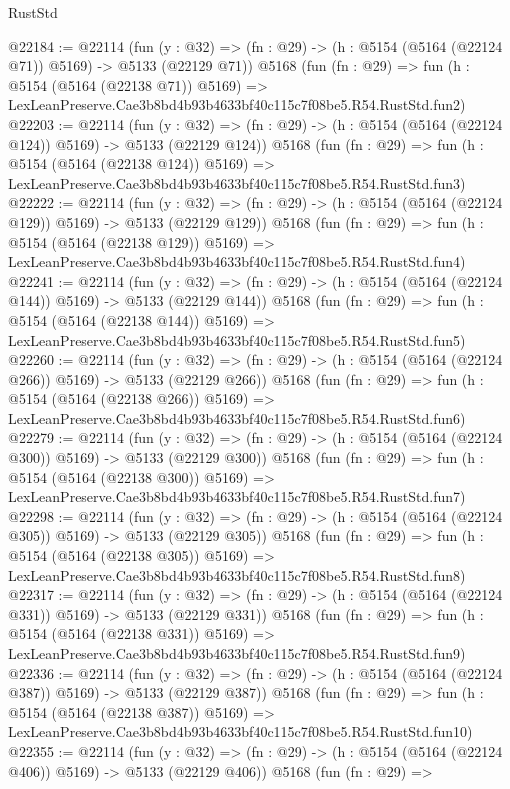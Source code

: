 \begin{lexlean}{RustStd}
\begin{coremodule}
@22184 := @22114
    (fun (y : @32) => (fn : @29) -> (h : @5154 (@5164 (@22124 @71)) @5169) -> @5133 (@22129 @71))
    @5168
    (fun (fn : @29) =>
    fun (h : @5154 (@5164 (@22138 @71)) @5169) =>
    LexLeanPreserve.Cae3b8bd4b93b4633bf40c115c7f08be5.R54.RustStd.fun2)
@22203 := @22114
    (fun (y : @32) => (fn : @29) -> (h : @5154 (@5164 (@22124 @124)) @5169) -> @5133 (@22129 @124))
    @5168
    (fun (fn : @29) =>
    fun (h : @5154 (@5164 (@22138 @124)) @5169) =>
    LexLeanPreserve.Cae3b8bd4b93b4633bf40c115c7f08be5.R54.RustStd.fun3)
@22222 := @22114
    (fun (y : @32) => (fn : @29) -> (h : @5154 (@5164 (@22124 @129)) @5169) -> @5133 (@22129 @129))
    @5168
    (fun (fn : @29) =>
    fun (h : @5154 (@5164 (@22138 @129)) @5169) =>
    LexLeanPreserve.Cae3b8bd4b93b4633bf40c115c7f08be5.R54.RustStd.fun4)
@22241 := @22114
    (fun (y : @32) => (fn : @29) -> (h : @5154 (@5164 (@22124 @144)) @5169) -> @5133 (@22129 @144))
    @5168
    (fun (fn : @29) =>
    fun (h : @5154 (@5164 (@22138 @144)) @5169) =>
    LexLeanPreserve.Cae3b8bd4b93b4633bf40c115c7f08be5.R54.RustStd.fun5)
@22260 := @22114
    (fun (y : @32) => (fn : @29) -> (h : @5154 (@5164 (@22124 @266)) @5169) -> @5133 (@22129 @266))
    @5168
    (fun (fn : @29) =>
    fun (h : @5154 (@5164 (@22138 @266)) @5169) =>
    LexLeanPreserve.Cae3b8bd4b93b4633bf40c115c7f08be5.R54.RustStd.fun6)
@22279 := @22114
    (fun (y : @32) => (fn : @29) -> (h : @5154 (@5164 (@22124 @300)) @5169) -> @5133 (@22129 @300))
    @5168
    (fun (fn : @29) =>
    fun (h : @5154 (@5164 (@22138 @300)) @5169) =>
    LexLeanPreserve.Cae3b8bd4b93b4633bf40c115c7f08be5.R54.RustStd.fun7)
@22298 := @22114
    (fun (y : @32) => (fn : @29) -> (h : @5154 (@5164 (@22124 @305)) @5169) -> @5133 (@22129 @305))
    @5168
    (fun (fn : @29) =>
    fun (h : @5154 (@5164 (@22138 @305)) @5169) =>
    LexLeanPreserve.Cae3b8bd4b93b4633bf40c115c7f08be5.R54.RustStd.fun8)
@22317 := @22114
    (fun (y : @32) => (fn : @29) -> (h : @5154 (@5164 (@22124 @331)) @5169) -> @5133 (@22129 @331))
    @5168
    (fun (fn : @29) =>
    fun (h : @5154 (@5164 (@22138 @331)) @5169) =>
    LexLeanPreserve.Cae3b8bd4b93b4633bf40c115c7f08be5.R54.RustStd.fun9)
@22336 := @22114
    (fun (y : @32) => (fn : @29) -> (h : @5154 (@5164 (@22124 @387)) @5169) -> @5133 (@22129 @387))
    @5168
    (fun (fn : @29) =>
    fun (h : @5154 (@5164 (@22138 @387)) @5169) =>
    LexLeanPreserve.Cae3b8bd4b93b4633bf40c115c7f08be5.R54.RustStd.fun10)
@22355 := @22114
    (fun (y : @32) => (fn : @29) -> (h : @5154 (@5164 (@22124 @406)) @5169) -> @5133 (@22129 @406))
    @5168
    (fun (fn : @29) =>

\end{coremodule}
\end{lexlean}
